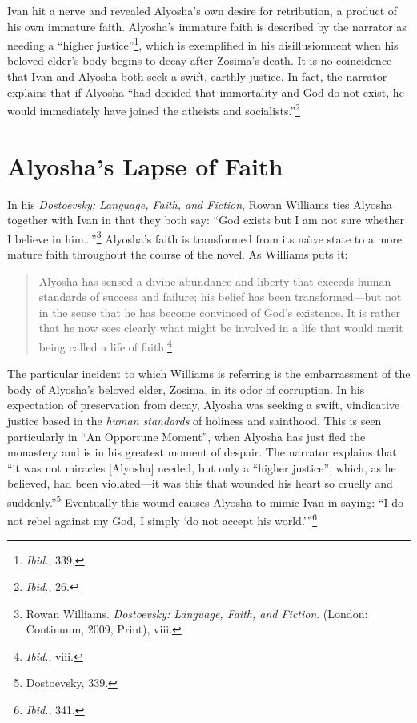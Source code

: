 Ivan hit a nerve and revealed Alyosha's own desire for retribution, a product of his own immature faith. Alyosha's immature faith is described by the narrator as needing a ``higher justice''\footnote{\emph{Ibid.}, 339.}, which is exemplified in his disillusionment when his beloved elder's body begins to decay after Zosima's death. It is no coincidence that Ivan and Alyosha both seek a swift, earthly justice. In fact, the narrator explains that if Alyosha ``had decided that immortality and God do not exist, he would immediately have joined the atheists and socialists.''\footnote{\emph{Ibid.}, 26.} 

\section{Alyosha's Lapse of Faith}
In his \emph{Dostoevsky: Language, Faith, and Fiction}, Rowan Williams ties Alyosha together with Ivan in that they both say: ``God exists but I am not sure whether I believe in him\ldots''\footnote{Rowan Williams. \emph{Dostoevsky: Language, Faith, and Fiction}. (London: Continuum, 2009, Print), viii.} Alyosha's faith is transformed from its na\"{\i}ve state to a more mature faith throughout the course of the novel. As Williams puts it: 

\begin{quote}
\onehalfspacing
Alyosha has sensed a divine abundance and liberty that exceeds human standards of success and failure; his belief has been transformed---but not in the sense that he has become convinced of God's existence. It is rather that he now sees clearly what might be involved in a life that would merit being called a life of faith.\footnote{\emph{Ibid.}, viii.} 
\end{quote}

The particular incident to which Williams is referring is the embarrassment of the body of Alyosha's beloved elder, Zosima, in its odor of corruption. In his expectation of preservation from decay, Alyosha was seeking a swift, vindicative justice based in the \emph{human standards} of holiness and sainthood. This is seen particularly in ``An Opportune Moment'', when Alyosha has just fled the monastery and is in his greatest moment of despair. The narrator explains that ``it was not miracles [Alyosha] needed, but only a ``higher justice'', which, as he believed, had been violated---it was this that wounded his heart so cruelly and suddenly.''\footnote{Dostoevsky, 339.} Eventually this wound causes Alyosha to mimic Ivan in saying: ``I do not rebel against my God, I simply `do not accept his world.'\thinspace''\footnote{\emph{Ibid.}, 341.}

